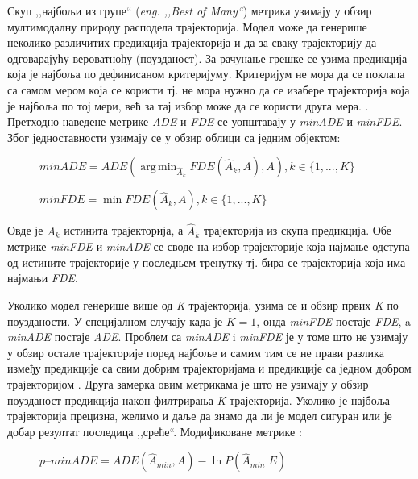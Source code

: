 \documentclass[11pt,oneside]{memoir}
\DeclareMathOperator*{\argmin}{arg\,min}
\begin{document}
Скуп ,,најбољи из групе`` (\textit{eng. ,,Best of Many``}) метрика узимају у обзир мултимодалну природу расподела трајекторија. Модел може
да генерише неколико различитих предикција трајекторија и да за сваку трајекторију да одговарајућу вероватноћу (поузданост). За рачунање грешке 
се узима предикција која је најбоља по дефинисаном критеријуму. Критеријум не мора да се поклапа са самом мером која се користи 
тј. не мора нужно да се изабере трајекторија која је најбоља по тој мери, већ за тај избор може да се користи друга мера. \cite{best_of_many_cvae, argoverse}. 
Претходно наведене метрике \textit{ADE} и \textit{FDE} се уопштавају у \textit{minADE} и \textit{minFDE}. Због једноставности узимају се у обзир облици
са једним објектом: \cite{Disdis, best_of_many_cvae}

\begin{figure}[H]
  \centering
  $minADE = ADE(\displaystyle\argmin_{\hat{A}_k} FDE(\hat{A}_k, A), A), k \in \{1, ..., K\}$ 
\end{figure}

\begin{figure}[H]
  \centering
  $minFDE = \displaystyle\min FDE(\hat{A}_k, A), k \in \{1, ..., K\}$
\end{figure}

Овде је $A_k$ истинита трајекторија, а $\hat{A}_k$ трајекторија из скупа предикција. Обе метрике \textit{minFDE} и \textit{minADE} 
се своде на избор трајекторије која најмање одступа од истините трајекторије у последњем тренутку тј. бира се трајекторија која има најмањи \textit{FDE}.

Уколико модел генерише више од \textit{K} трајекторија, узима се и обзир првих \textit{K} по поузданости. У специјалном случају када је $K = 1$, онда 
\textit{minFDE} постаје \textit{FDE}, a \textit{minADE} постаје \textit{ADE}. 
Проблем са \textit{minADE} i \textit{minFDE} је у томе што не узимају у обзир остале трајекторије поред најбоље и самим тим се не прави разлика
између предикције са свим добрим трајекторијама и предикције са једном добром трајекторијом \cite{Disdis}. 
Друга замерка овим метрикама је што не узимају у обзир поузданост предикција након филтрирања \textit{K} трајекторија. Уколико је најбоља трајекторија
прецизна, желимо и даље да знамо да ли је модел сигуран или је добар резултат последица ,,среће``. Модификоване метрике \cite{home}: 

\begin{figure}[H]
  \centering
  $p\mbox{--}minADE = ADE(\hat{A}_{min}, A) - \ln{P(\hat{A}_{min}|E)}$
\end{figure}
\end{document}
